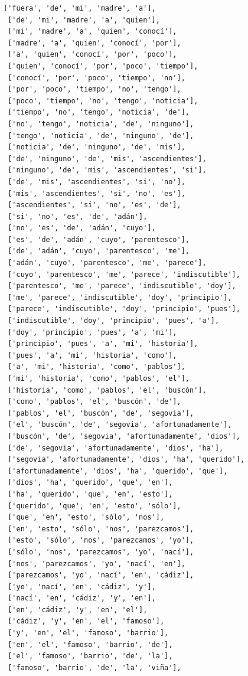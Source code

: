 \documentclass[11pt]{article}
\begin{document}
\begin{tcolorbox}[breakable, size=fbox, boxrule=1pt, pad at break*=1mm,colback=cellbackground, colframe=cellborder]
\begin{Verbatim}[commandchars=\\\{\}]
 ['fuera', 'de', 'mi', 'madre', 'a'],
 ['de', 'mi', 'madre', 'a', 'quien'],
 ['mi', 'madre', 'a', 'quien', 'conocí'],
 ['madre', 'a', 'quien', 'conocí', 'por'],
 ['a', 'quien', 'conocí', 'por', 'poco'],
 ['quien', 'conocí', 'por', 'poco', 'tiempo'],
 ['conocí', 'por', 'poco', 'tiempo', 'no'],
 ['por', 'poco', 'tiempo', 'no', 'tengo'],
 ['poco', 'tiempo', 'no', 'tengo', 'noticia'],
 ['tiempo', 'no', 'tengo', 'noticia', 'de'],
 ['no', 'tengo', 'noticia', 'de', 'ninguno'],
 ['tengo', 'noticia', 'de', 'ninguno', 'de'],
 ['noticia', 'de', 'ninguno', 'de', 'mis'],
 ['de', 'ninguno', 'de', 'mis', 'ascendientes'],
 ['ninguno', 'de', 'mis', 'ascendientes', 'si'],
 ['de', 'mis', 'ascendientes', 'si', 'no'],
 ['mis', 'ascendientes', 'si', 'no', 'es'],
 ['ascendientes', 'si', 'no', 'es', 'de'],
 ['si', 'no', 'es', 'de', 'adán'],
 ['no', 'es', 'de', 'adán', 'cuyo'],
 ['es', 'de', 'adán', 'cuyo', 'parentesco'],
 ['de', 'adán', 'cuyo', 'parentesco', 'me'],
 ['adán', 'cuyo', 'parentesco', 'me', 'parece'],
 ['cuyo', 'parentesco', 'me', 'parece', 'indiscutible'],
 ['parentesco', 'me', 'parece', 'indiscutible', 'doy'],
 ['me', 'parece', 'indiscutible', 'doy', 'principio'],
 ['parece', 'indiscutible', 'doy', 'principio', 'pues'],
 ['indiscutible', 'doy', 'principio', 'pues', 'a'],
 ['doy', 'principio', 'pues', 'a', 'mi'],
 ['principio', 'pues', 'a', 'mi', 'historia'],
 ['pues', 'a', 'mi', 'historia', 'como'],
 ['a', 'mi', 'historia', 'como', 'pablos'],
 ['mi', 'historia', 'como', 'pablos', 'el'],
 ['historia', 'como', 'pablos', 'el', 'buscón'],
 ['como', 'pablos', 'el', 'buscón', 'de'],
 ['pablos', 'el', 'buscón', 'de', 'segovia'],
 ['el', 'buscón', 'de', 'segovia', 'afortunadamente'],
 ['buscón', 'de', 'segovia', 'afortunadamente', 'dios'],
 ['de', 'segovia', 'afortunadamente', 'dios', 'ha'],
 ['segovia', 'afortunadamente', 'dios', 'ha', 'querido'],
 ['afortunadamente', 'dios', 'ha', 'querido', 'que'],
 ['dios', 'ha', 'querido', 'que', 'en'],
 ['ha', 'querido', 'que', 'en', 'esto'],
 ['querido', 'que', 'en', 'esto', 'sólo'],
 ['que', 'en', 'esto', 'sólo', 'nos'],
 ['en', 'esto', 'sólo', 'nos', 'parezcamos'],
 ['esto', 'sólo', 'nos', 'parezcamos', 'yo'],
 ['sólo', 'nos', 'parezcamos', 'yo', 'nací'],
 ['nos', 'parezcamos', 'yo', 'nací', 'en'],
 ['parezcamos', 'yo', 'nací', 'en', 'cádiz'],
 ['yo', 'nací', 'en', 'cádiz', 'y'],
 ['nací', 'en', 'cádiz', 'y', 'en'],
 ['en', 'cádiz', 'y', 'en', 'el'],
 ['cádiz', 'y', 'en', 'el', 'famoso'],
 ['y', 'en', 'el', 'famoso', 'barrio'],
 ['en', 'el', 'famoso', 'barrio', 'de'],
 ['el', 'famoso', 'barrio', 'de', 'la'],
 ['famoso', 'barrio', 'de', 'la', 'viña'],

\end{Verbatim}
\end{tcolorbox}
\end{document}
